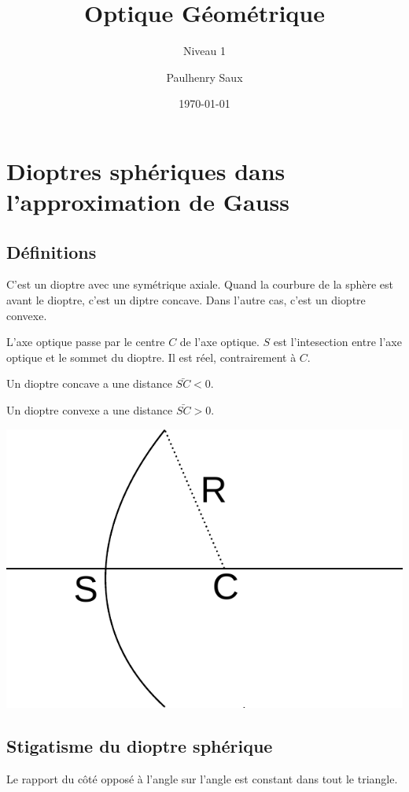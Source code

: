 \documentclass[french]{yLectureNote}
\title{Optique Géométrique}
\subtitle{Niveau 1}
\author{Paulhenry Saux}
\date{\today}
\begin{document}
\setcounter{chapter}{3}
\chapter{Dioptres sphériques dans l'approximation de Gauss}
\section{Définitions}
\begin{definition}
C'est un dioptre avec une symétrique axiale. Quand la courbure de la sphère est avant le dioptre, c'est un diptre concave. Dans l'autre cas, c'est un dioptre convexe.
\end{definition}
L'axe optique passe par le centre $C$ de l'axe optique. $S$ est l'intesection entre l'axe optique et le sommet du dioptre. Il est réel, contrairement à $C$.

Un dioptre concave a une distance $\bar{SC} < 0$.

Un dioptre convexe a une distance $\bar{SC} > 0$.

\includegraphics[scale=0.5]{dioptre_convexe}

\section{Stigatisme du dioptre sphérique}
\begin{theorem}
 Le rapport du c\^oté opposé à l'angle sur l'angle est constant dans tout le triangle.
\end{theorem}
%
%
%
%
\end{document}
